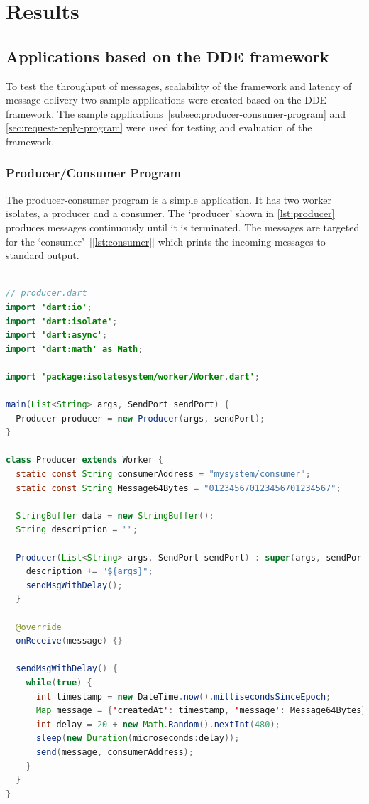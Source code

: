 \chapter{Results}
\label{chapter:results}

\section{Applications based on the DDE framework}
\label{sec:result-applications}
  To test the throughput of messages, scalability of the framework and latency of message delivery two sample applications were created based on the DDE framework. The sample applications~\autoref{subsec:producer-consumer-program} and
  \autoref{sec:request-reply-program} were used for testing and evaluation of the framework.

\subsection{Producer/Consumer Program}
\label{subsec:producer-consumer-program}
  The producer-consumer program is a simple application. It has two worker isolates, a producer and a consumer. The ‘producer’ shown in \autoref{lst:producer} produces messages continuously until it is terminated. The messages are targeted for the ‘consumer’~[\autoref{lst:consumer}] which prints the incoming messages to standard output.

\begin{lstlisting}[language=java, firstnumber=1, caption=Basic version of Producer Worker of Producer-Consumer application, label=lst:producer]

// producer.dart
import 'dart:io';
import 'dart:isolate';
import 'dart:async';
import 'dart:math' as Math;

import 'package:isolatesystem/worker/Worker.dart';

main(List<String> args, SendPort sendPort) {
  Producer producer = new Producer(args, sendPort);
}

class Producer extends Worker {
  static const String consumerAddress = "mysystem/consumer";
  static const String Message64Bytes = "012345670123456701234567";

  StringBuffer data = new StringBuffer();
  String description = "";

  Producer(List<String> args, SendPort sendPort) : super(args, sendPort) {
    description += "${args}";
    sendMsgWithDelay();
  }

  @override
  onReceive(message) {}

  sendMsgWithDelay() {
    while(true) {
      int timestamp = new DateTime.now().millisecondsSinceEpoch;
      Map message = {'createdAt': timestamp, 'message': Message64Bytes};
      int delay = 20 + new Math.Random().nextInt(480);
      sleep(new Duration(microseconds:delay));
      send(message, consumerAddress);
    }
  }
}
\end{lstlisting}


